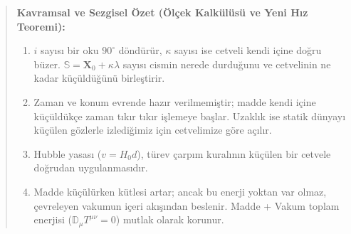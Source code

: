 \begin{quote}
    \small
    \textbf{Kavramsal ve Sezgisel Özet (Ölçek Kalkülüsü ve Yeni Hız Teoremi):}
    \begin{enumerate}
        \item $i$ sayısı bir oku $90^\circ$ döndürür, $\kappa$ sayısı ise cetveli kendi içine doğru büzer. $\mathbb{S} = \mathbf{X}_0 + \kappa \lambda$ sayısı cismin nerede durduğunu ve cetvelinin ne kadar küçüldüğünü birleştirir.
        \item Zaman ve konum evrende hazır verilmemiştir; madde kendi içine küçüldükçe zaman tıkır tıkır işlemeye başlar. Uzaklık ise statik dünyayı küçülen gözlerle izlediğimiz için cetvelimize göre açılır.
        \item Hubble yasası ($v = H_0 d$), türev çarpım kuralının küçülen bir cetvele doğrudan uygulanmasıdır.
        \item Madde küçülürken kütlesi artar; ancak bu enerji yoktan var olmaz, çevreleyen vakumun içeri akışından beslenir. Madde + Vakum toplam enerjisi ($\mathbb{D}_\mu T^{\mu\nu}=0$) mutlak olarak korunur.
    \end{enumerate}
\end{quote}

